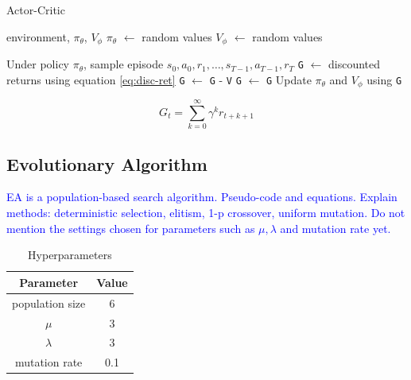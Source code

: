 \documentclass{article}
\newcommand{\TODO}[1]{\textcolor{blue}{#1}}
\begin{document}
\begin{algorithm}[htbp]
    \caption{Actor-Critic}
    \label{alg:trunk}
    \begin{algorithmic}[1]
         environment, $\pi_\theta$, $V_\phi$
        \STATE \texttt{$\pi_\theta$} $\gets$ random values
        \STATE \texttt{$V_\phi$} $\gets$ random values
        
            \STATE Under policy $\pi_\theta$,
            \STATE sample episode $s_0, a_0, r_1, \dots, s_{T-1}, a_{T-1}, r_T$
            \STATE \texttt{G} $\gets$ discounted returns using equation \ref{eq:disc-ret}
                \STATE \texttt{G} $\gets$ \texttt{G} - \texttt{V}
            \ELSE
                \STATE \texttt{G} $\gets$ \texttt{G}
            \ENDIF
            \STATE Update $\pi_\theta$ and $V_\phi$ using \texttt{G}
        \ENDWHILE
    \end{algorithmic}
\end{algorithm}

\begin{equation}
    \label{eq:disc-ret}
    G_t = \sum_{k=0}^{\infty} \gamma^k r_{t+k+1}
\end{equation}

\subsection{Evolutionary Algorithm}

\TODO{
    EA is a population-based search algorithm.
    Pseudo-code and equations.
    Explain methods: deterministic selection, elitism, 1-p crossover, uniform mutation.
    Do not mention the settings chosen for parameters such as $\mu, \lambda$ and mutation rate yet.
}

\begin{table}[htbp]
    \centering
    \begin{tabular}
        {|c|c|}
        \toprule
        \textbf{Parameter} & \textbf{Value} \\
        \midrule
        population size & 6 \\
        $\mu$           & 3 \\
        $\lambda$       & 3 \\
        mutation rate   & 0.1 \\
        \bottomrule
    \end{tabular}
    \caption{Hyperparameters}
    \label{tab:hyper}
\end{table}
\end{document}
